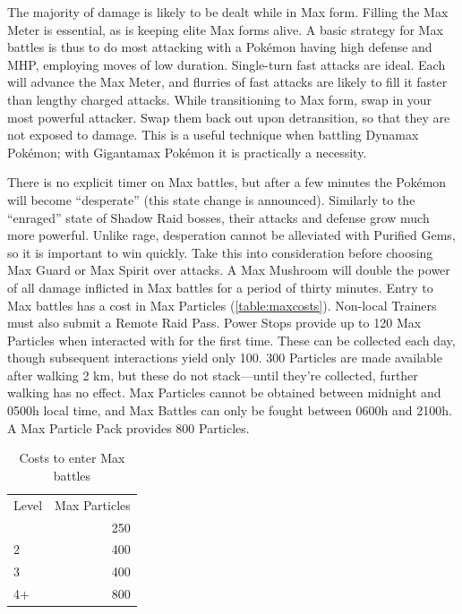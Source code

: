 The majority of damage is likely to be dealt while in Max form.
Filling the Max Meter is essential, as is keeping elite Max forms alive.
A basic strategy for Max battles is thus to do most attacking with a Pokémon having
  high defense and MHP, employing moves of low duration.
Single-turn fast attacks are ideal.
Each will advance the Max Meter, and flurries of fast attacks are likely to
 fill it faster than lengthy charged attacks.
While transitioning to Max form, swap in your most powerful attacker.
Swap them back out upon detransition, so that they are not exposed to damage.
This is a useful technique when battling Dynamax Pokémon; with Gigantamax Pokémon it is practically a necessity.

There is no explicit timer on Max battles, but after a few minutes the Pokémon
  will become ``desperate'' (this state change is announced).
Similarly to the ``enraged'' state of Shadow Raid bosses, their attacks and
  defense grow much more powerful.
Unlike rage, desperation cannot be alleviated with Purified Gems, so it
  is important to win quickly.
Take this into consideration before choosing Max Guard or Max Spirit over attacks.
A Max Mushroom will double the power of all damage inflicted in
  Max battles for a period of thirty minutes.
Entry to Max battles has a cost in Max Particles (\autoref{table:maxcosts}).
Non-local Trainers must also submit a Remote Raid Pass.
Power Stops provide up to 120 Max Particles when interacted with for the first time.
These can be collected each day, though subsequent interactions yield only 100.
300 Particles are made available after walking 2 km, but these do not stack---until
 they're collected, further walking has no effect.
Max Particles cannot be obtained between midnight and 0500h local time,
  and Max Battles can only be fought between 0600h and 2100h.
A Max Particle Pack provides 800 Particles.
\begin{table}
\centering
\begin{tabular}{lr}
Level & Max Particles\\
\Midrule
  1 & 250\\
  2 & 400\\
  3 & 400\\
  4+ & 800\\
\end{tabular}
\caption{Costs to enter Max battles}
\label{table:maxcosts}
\end{table}
